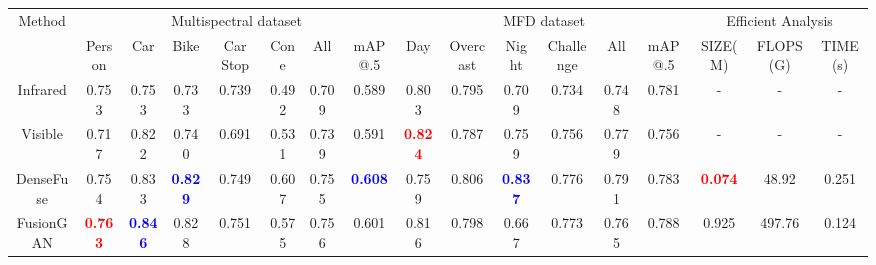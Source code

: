 \documentclass[10pt,twocolumn,letterpaper]{article}
\begin{document}
\begin{table*}[!htb]
	\centering
	\renewcommand\arraystretch{1.1} 
	\setlength{\tabcolsep}{0.5mm}
	\begin{tabular}{|c|cccccc|c|ccccc|c|ccc|}
		\hline
		\multirow{2}{*}{\footnotesize Method}&\multicolumn{7}{c|}{\footnotesize Multispectral dataset}&\multicolumn{6}{c|}{\footnotesize MFD dataset}&\multicolumn{3}{c|}{\footnotesize Efficient Analysis}\\
		\cline{2-17} 
		~&\footnotesize Person&\footnotesize Car&\footnotesize Bike&\footnotesize Car Stop 
		&\footnotesize Cone &\footnotesize All&\footnotesize mAP@.5&\footnotesize Day&\footnotesize Overcast&\footnotesize Night&\footnotesize Challenge&\footnotesize All&\footnotesize mAP@.5&\footnotesize SIZE(M)&\footnotesize FLOPS(G)&\footnotesize TIME(s)\\
\hline
		\footnotesize Infrared&\footnotesize 0.753 &\footnotesize 0.753 &\footnotesize 0.733 &\footnotesize 0.739 &\footnotesize 0.492 &\footnotesize 0.709 &\footnotesize 0.589 &\footnotesize 0.803 &\footnotesize 0.795 &\footnotesize 0.709 &\footnotesize 0.734 &\footnotesize 0.748 &\footnotesize 0.781&-&-&-\\
		\hline 
		\footnotesize Visible&\footnotesize 0.717 &\footnotesize 0.822 &\footnotesize 0.740 &\footnotesize 0.691 &\footnotesize 0.531 &\footnotesize 0.739 &\footnotesize 0.591 &\footnotesize \textcolor{red}{\textbf{0.824}} &\footnotesize 0.787 &\footnotesize 0.759 &\footnotesize 0.756 &\footnotesize 0.779 &\footnotesize 0.756 &-&-&-\\
		\hline 
		
		\footnotesize DenseFuse&\footnotesize 0.754&\footnotesize 0.833&\footnotesize \textcolor{blue}{\textbf{0.829}}&\footnotesize 0.749&\footnotesize 0.607 &\footnotesize 0.755&\footnotesize \textcolor{blue}{\textbf{0.608}}&\footnotesize 0.759&\footnotesize 0.806&\footnotesize \textcolor{blue}{\textbf{0.837}}&\footnotesize 0.776&\footnotesize 0.791&\footnotesize 0.783&\footnotesize \textcolor{red}{\textbf{0.074}}&\footnotesize 48.92&\footnotesize 0.251  \\
		\hline 
		
		\footnotesize FusionGAN&\footnotesize \textcolor{red}{\textbf{0.763}}&\footnotesize \textcolor{blue}{\textbf{0.846}}&\footnotesize 0.828&\footnotesize  0.751&\footnotesize  0.575&\footnotesize 0.756&\footnotesize 0.601&\footnotesize 0.816&\footnotesize 0.798&\footnotesize 0.667&\footnotesize 0.773&\footnotesize 0.765&\footnotesize 0.788 &\footnotesize 0.925&\footnotesize 497.76 &\footnotesize 0.124 \\
		\hline 
		

\end{tabular}
\end{table*}
\end{document}
